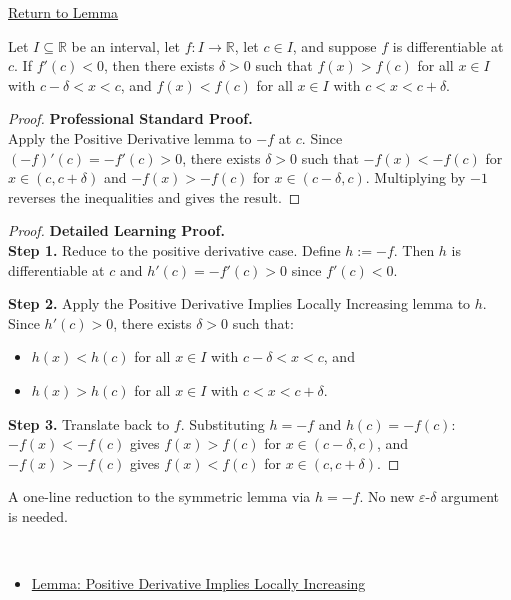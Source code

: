 \newpage
{}
\label{prf:negative-derivative-implies-locally-decreasing}

\begin{remark*}[Return]
\hyperref[lem:negative-derivative-implies-locally-decreasing]{Return to Lemma}
\end{remark*}

\begin{theorem*}
Let $I \subseteq \mathbb{R}$ be an interval, let $f : I \to \mathbb{R}$, let $c \in I$, and suppose $f$ is differentiable at $c$. If $f'(c) < 0$, then there exists $\delta > 0$ such that $f(x) > f(c)$ for all $x \in I$ with $c - \delta < x < c$, and $f(x) < f(c)$ for all $x \in I$ with $c < x < c + \delta$.
\end{theorem*}

\begin{proof}
\textbf{Professional Standard Proof.}~\\
Apply the Positive Derivative lemma to $-f$ at $c$. Since $(-f)'(c) = -f'(c) > 0$, there exists $\delta > 0$ such that $-f(x) < -f(c)$ for $x \in (c,c+\delta)$ and $-f(x) > -f(c)$ for $x \in (c-\delta,c)$. Multiplying by $-1$ reverses the inequalities and gives the result.
\end{proof}

\begin{proof}
\textbf{Detailed Learning Proof.}~\\

\textbf{Step 1.} Reduce to the positive derivative case. Define $h := -f$. Then $h$ is differentiable at $c$ and $h'(c) = -f'(c) > 0$ since $f'(c) < 0$.

\textbf{Step 2.} Apply the Positive Derivative Implies Locally Increasing lemma to $h$. Since $h'(c) > 0$, there exists $\delta > 0$ such that:
\begin{itemize}
  \item $h(x) < h(c)$ for all $x \in I$ with $c - \delta < x < c$, and
  \item $h(x) > h(c)$ for all $x \in I$ with $c < x < c + \delta$.
\end{itemize}

\textbf{Step 3.} Translate back to $f$. Substituting $h = -f$ and $h(c) = -f(c)$: $-f(x) < -f(c)$ gives $f(x) > f(c)$ for $x \in (c-\delta,c)$, and $-f(x) > -f(c)$ gives $f(x) < f(c)$ for $x \in (c,c+\delta)$.
\end{proof}

\begin{remark*}
A one-line reduction to the symmetric lemma via $h = -f$. No new $\varepsilon$-$\delta$ argument is needed.
\end{remark*}

\begin{remark*}[Dependencies]~\\
\begin{itemize}
  \item \hyperref[lem:positive-derivative-implies-locally-increasing]{Lemma: Positive Derivative Implies Locally Increasing}
\end{itemize}
\end{remark*}
